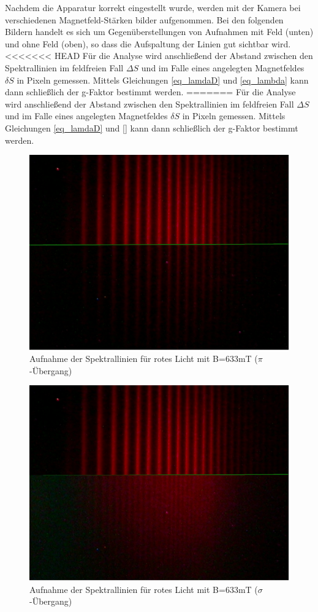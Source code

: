 Nachdem die Apparatur korrekt eingestellt wurde, werden mit der Kamera bei verschiedenen Magnetfeld-Stärken bilder aufgenommen. Bei den folgenden Bildern handelt es sich um Gegenüberstellungen von Aufnahmen mit Feld (unten) und ohne Feld (oben), so dass die Aufspaltung der Linien gut sichtbar wird.\\
<<<<<<< HEAD
Für die Analyse wird anschließend der Abstand zwischen den Spektrallinien im feldfreien Fall $\Delta S$ und im Falle eines angelegten Magnetfeldes $\delta S$ in Pixeln gemessen. Mittels Gleichungen \eqref{eq_lamdaD} und \eqref{eq_lambda} kann dann schließlich der g-Faktor bestimmt werden.
=======
Für die Analyse wird anschließend der Abstand zwischen den Spektrallinien im feldfreien Fall $\Delta S$ und im Falle eines angelegten Magnetfeldes $\delta S$ in Pixeln gemessen. Mittels Gleichungen \eqref{eq_lamdaD} und \eqref{} kann dann schließlich der g-Faktor bestimmt werden.
\newpage
\begin{figure}[htbp]
\includegraphics[scale=.5]{../pics/red1.pdf}
\caption{Aufnahme der Spektrallinien für rotes Licht mit B=633mT ($\pi$-Übergang)}
\label{pic_red1}
\end{figure}
\begin{figure}[htbp]
\includegraphics[scale=.5]{../pics/red2.pdf}
\caption{Aufnahme der Spektrallinien für rotes Licht mit B=633mT ($\sigma$-Übergang)}
\label{pic_red2}
\end{figure}
